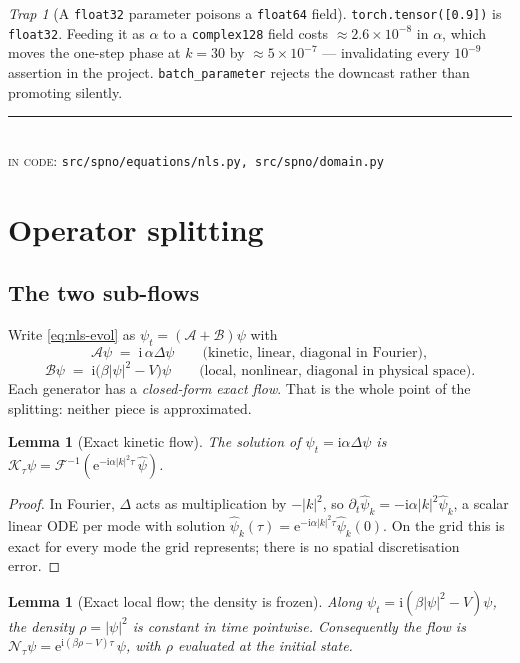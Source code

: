 \documentclass[11pt,a4paper]{article}
\theoremstyle{plain}
\newtheorem{lemma}[theorem]{Lemma}
\theoremstyle{definition}
\theoremstyle{remark}
\newtheorem{trap}[theorem]{Trap}
\newcommand{\iu}{\mathrm{i}}
\newcommand{\eu}{\mathrm{e}}
\newcommand{\lap}{\Delta}
\newcommand{\Kop}{\mathcal{K}}
\newcommand{\Nop}{\mathcal{N}}
\newcommand{\code}[1]{\texttt{\small #1}}
\newcommand{\src}[1]{{\color{linknavy}\texttt{\footnotesize #1}}}
\newcommand{\sourcenote}[1]{%
  \par\vspace{0.35em}\noindent
  {\footnotesize\color{rulegray}\rule{\linewidth}{0.4pt}\\[0.25em]
  \textsc{in code:} \src{#1}}\par\vspace{0.5em}}
\begin{document}
\begin{trap}[A \texttt{float32} parameter poisons a \texttt{float64} field]
\label{trap:param}
\code{torch.tensor([0.9])} is \code{float32}. Feeding it as $\alpha$ to a
\code{complex128} field costs $\approx 2.6\times10^{-8}$ in $\alpha$, which moves the
one-step phase at $k=30$ by $\approx5\times10^{-7}$ --- invalidating every
$10^{-9}$ assertion in the project. \code{batch\_parameter} rejects the downcast rather
than promoting silently.
\end{trap}

\sourcenote{src/spno/equations/nls.py, src/spno/domain.py}

\newpage
\section{Operator splitting}
\label{sec:splitting}

\subsection{The two sub-flows}

Write \eqref{eq:nls-evol} as $\psi_t = (\mathcal{A} + \mathcal{B})\psi$ with
\[
\mathcal{A}\psi \;=\; \iu\,\alpha\lap\psi
\qquad\text{(kinetic, linear, diagonal in Fourier)},
\]
\[
\mathcal{B}\psi \;=\; \iu\bigl(\beta|\psi|^2 - V\bigr)\psi
\qquad\text{(local, nonlinear, diagonal in physical space)}.
\]
Each generator has a \emph{closed-form exact flow}. That is the whole point of the
splitting: neither piece is approximated.

\begin{lemma}[Exact kinetic flow]
\label{lem:kinetic}
The solution of $\psi_t = \iu\alpha\lap\psi$ is
$\Kop_\tau\psi = \mathcal{F}^{-1}\!\left(\eu^{-\iu\alpha|k|^2\tau}\,\widehat\psi\right)$.
\end{lemma}

\begin{proof}
In Fourier, $\lap$ acts as multiplication by $-|k|^2$, so
$\partial_t\widehat\psi_k = -\iu\alpha|k|^2\widehat\psi_k$, a scalar linear ODE per mode
with solution $\widehat\psi_k(\tau)=\eu^{-\iu\alpha|k|^2\tau}\widehat\psi_k(0)$. On the
grid this is exact for every mode the grid represents; there is no spatial discretisation
error.
\end{proof}

\begin{lemma}[Exact local flow; the density is frozen]
\label{lem:local}
Along $\psi_t = \iu(\beta|\psi|^2-V)\psi$, the density $\rho = |\psi|^2$ is constant in
time \emph{pointwise}. Consequently the flow is
$\Nop_\tau\psi = \eu^{\iu(\beta\rho - V)\tau}\,\psi$, with $\rho$ evaluated at the initial
state.
\end{lemma}
\end{document}
